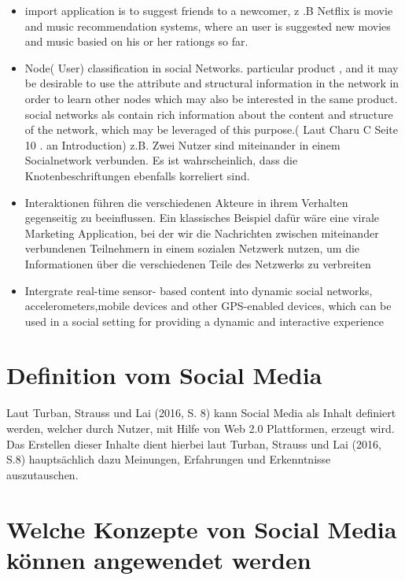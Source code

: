 \begin{itemize}
\item import application is to suggest  friends to a newcomer, z .B Netflix   is movie and music recommendation systems, where an user is suggested new movies and music basied on his or her rationgs so far.
\item Node( User) classification in social Networks. particular product , and it may be desirable to use the attribute and structural information in the network in order to learn other nodes which may also be interested in the same product. social networks als contain rich information about the content and structure of the network, which may be leveraged of this purpose.( Laut Charu C Seite 10 . an Introduction) z.B.  Zwei Nutzer sind miteinander in einem Socialnetwork verbunden. Es ist wahrscheinlich, dass die Knotenbeschriftungen ebenfalls korreliert sind.
\item Interaktionen  führen  die verschiedenen Akteure in ihrem Verhalten gegenseitig zu beeinflussen. Ein klassisches Beispiel dafür wäre eine virale Marketing Application, bei der wir die Nachrichten zwischen miteinander verbundenen Teilnehmern in einem sozialen Netzwerk nutzen, um die Informationen über die verschiedenen Teile des Netzwerks zu verbreiten
\item Intergrate real-time sensor- based content into dynamic social networks, accelerometers,mobile devices and other GPS-enabled devices, which can be used in a social setting for providing a dynamic and interactive experience
\end{itemize}


\section{Definition vom Social Media}

Laut Turban, Strauss und Lai (2016, S. 8) kann Social Media als Inhalt definiert werden, welcher durch Nutzer, mit Hilfe von Web 2.0 Plattformen, erzeugt wird. Das Erstellen dieser Inhalte dient hierbei laut Turban, Strauss und Lai (2016, S.8) hauptsächlich dazu Meinungen, Erfahrungen und Erkenntnisse auszutauschen.


\section{Welche Konzepte von Social Media können angewendet werden}


